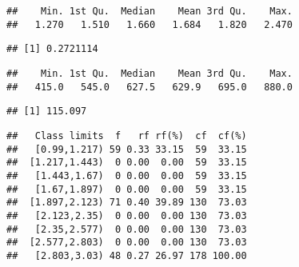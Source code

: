 \documentclass[
]{article}
\newenvironment{Shaded}{\begin{snugshade}}{\end{snugshade}}
\newcommand{\CommentTok}[1]{\textcolor[rgb]{0.56,0.35,0.01}{\textit{#1}}}
\newcommand{\DataTypeTok}[1]{\textcolor[rgb]{0.13,0.29,0.53}{#1}}
\newcommand{\KeywordTok}[1]{\textcolor[rgb]{0.13,0.29,0.53}{\textbf{#1}}}
\newcommand{\NormalTok}[1]{#1}
\newcommand{\OperatorTok}[1]{\textcolor[rgb]{0.81,0.36,0.00}{\textbf{#1}}}
\newcommand{\StringTok}[1]{\textcolor[rgb]{0.31,0.60,0.02}{#1}}
\begin{document}
\begin{verbatim}
##    Min. 1st Qu.  Median    Mean 3rd Qu.    Max. 
##   1.270   1.510   1.660   1.684   1.820   2.470
\end{verbatim}

\begin{Shaded}
\end{Shaded}

\begin{verbatim}
## [1] 0.2721114
\end{verbatim}

\begin{Shaded}
\end{Shaded}

\begin{verbatim}
##    Min. 1st Qu.  Median    Mean 3rd Qu.    Max. 
##   415.0   545.0   627.5   629.9   695.0   880.0
\end{verbatim}

\begin{Shaded}
\end{Shaded}

\begin{verbatim}
## [1] 115.097
\end{verbatim}

\begin{Shaded}
\end{Shaded}

\begin{verbatim}
##   Class limits  f   rf rf(%)  cf  cf(%)
##   [0.99,1.217) 59 0.33 33.15  59  33.15
##  [1.217,1.443)  0 0.00  0.00  59  33.15
##   [1.443,1.67)  0 0.00  0.00  59  33.15
##   [1.67,1.897)  0 0.00  0.00  59  33.15
##  [1.897,2.123) 71 0.40 39.89 130  73.03
##   [2.123,2.35)  0 0.00  0.00 130  73.03
##   [2.35,2.577)  0 0.00  0.00 130  73.03
##  [2.577,2.803)  0 0.00  0.00 130  73.03
##   [2.803,3.03) 48 0.27 26.97 178 100.00
\end{verbatim}
\end{document}
